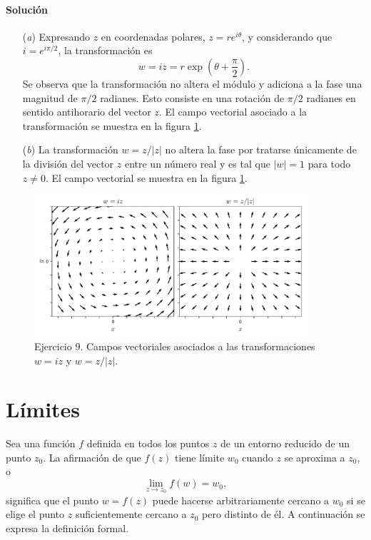 \documentclass[a4paper]{report}
\begin{document}
\paragraph{Solución}
\begin{enumerate}
 \item[(\textit{a})] Expresando \(z\) en coordenadas polares, \(z=re^{i\theta}\), y considerando que \(i=e^{i\pi/2}\), la transformación es
 \[
  w=iz=r\exp\left(\theta+\dfrac{\pi}{2}\right).
 \]
 Se observa que la transformación no altera el módulo y adiciona a la fase una magnitud de \(\pi/2\) radianes. Esto consiste en una rotación de \(\pi/2\) radianes en sentido antihorario del vector \(z\). El campo vectorial asociado a la transformación se muestra en la figura \ref{fig:exercise_14_09}.
 \item[(\textit{b})] La transformación \(w=z/|z|\) no altera la fase por tratarse únicamente de la división del vector \(z\) entre un número real y es tal que \(|w|=1\) para todo \(z\neq0\). El campo vectorial se muestra en la figura \ref{fig:exercise_14_09}.
\end{enumerate}
\begin{figure}[!htb]
 \begin{center}
 \includegraphics[width=0.9\textwidth]{figuras/exercise_14_09.pdf}
 \caption{\label{fig:exercise_14_09} Ejercicio 9. Campos vectoriales asociados a las transformaciones \(w=iz\) y \(w=z/|z|\).}
 \end{center}
\end{figure}

\section{Límites}

Sea una función \(f\) definida en todos los puntos \(z\) de un entorno reducido de un punto \(z_0\). La afirmación de que \(f(z)\) tiene límite \(w_0\) cuando \(z\) se aproxima a \(z_0\), o
\begin{equation}\label{eq:limit_statement}
 \lim_{z\to z_0}f(w)=w_0, 
\end{equation}
significa que el punto \(w=f(z)\) puede hacerse arbitrariamente cercano a \(w_0\) si se elige el punto \(z\) suficientemente cercano a \(z_0\) pero distinto de él. A continuación se expresa la definición formal.
\end{document}

